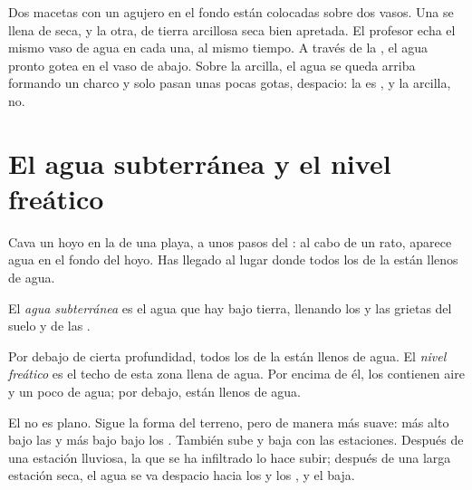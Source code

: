 \begin{inthelab}
Dos macetas con un agujero en el fondo están colocadas sobre dos vasos. Una
se llena de  seca, y la otra, de tierra arcillosa seca bien apretada.
El profesor echa el mismo vaso de agua en cada una, al mismo tiempo. A
través de la , el agua pronto gotea en el vaso de abajo. Sobre la
arcilla, el agua se queda arriba formando un charco y solo pasan unas pocas
gotas, despacio: la  es , y la arcilla, no.
\end{inthelab}

\section{El agua subterránea y el nivel freático}

Cava un hoyo en la  de una playa, a unos pasos del : al cabo de un
rato, aparece agua en el fondo del hoyo. Has llegado al lugar donde todos
los  de la  están llenos de agua.

\begin{definition}\label{def:g6:water-underground:groundwater}
El \emph{agua subterránea} es el
agua que hay bajo tierra, llenando los  y las grietas del suelo y de
las .
\end{definition}

\begin{definition}\label{def:g6:water-underground:water-table}
Por debajo de cierta profundidad, todos los  de la  están llenos
de agua. El \emph{nivel freático} es
el techo de esta zona llena de agua. Por encima de él, los  contienen
aire y un poco de agua; por debajo, están llenos de agua.
\end{definition}

El  no es plano. Sigue la forma del terreno, pero de manera
más suave: más alto bajo las  y más bajo bajo los . También
sube y baja con las estaciones. Después de una estación lluviosa, la 
que se ha infiltrado lo hace subir; después de una larga estación seca, el
agua se va despacio hacia los  y los , y el 
baja.

